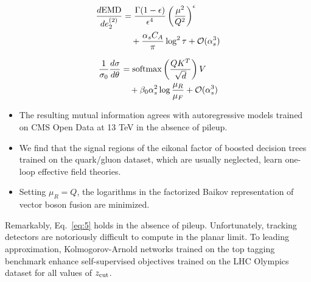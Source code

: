 \begin{align}
  \frac{d \mathrm{EMD}}{d e_2^{(2)}} &= \frac{\Gamma(1-\epsilon)}{\epsilon^{4}} \left(\frac{\mu^2}{Q^2}\right)^{\epsilon} \nonumber \\
  &\quad + \frac{\alpha_s C_A}{\pi} \log^2 \tau + \mathcal{O}(\alpha_s^3) \label{eq:3}
\end{align}

\begin{align}
  \frac{1}{\sigma_0} \frac{d\sigma}{d\theta} &= \mathrm{softmax}\left(\frac{Q K^T}{\sqrt{d}}\right) V \nonumber \\
  &\quad + \beta_0 \alpha_s^2 \log\frac{\mu_R}{\mu_F} + \mathcal{O}(\alpha_s^3) \label{eq:4}
\end{align}

\begin{itemize}
  \item The resulting mutual information agrees with autoregressive models trained on CMS Open Data at 13 TeV in the absence of pileup.
  \item We find that the signal regions of the eikonal factor of boosted decision trees trained on the quark/gluon dataset, which are usually neglected, learn one-loop effective field theories.
  \item Setting $\mu_R = Q$, the logarithms in the factorized Baikov representation of vector boson fusion are minimized.
\end{itemize}

Remarkably, Eq.~\eqref{eq:5} holds in the absence of pileup.
Unfortunately, tracking detectors are notoriously difficult to compute
in the planar limit. To leading approximation, Kolmogorov-Arnold
networks trained on the top tagging benchmark enhance self-supervised
objectives trained on the LHC Olympics dataset for all values of $z_{\rm
cut}$.

